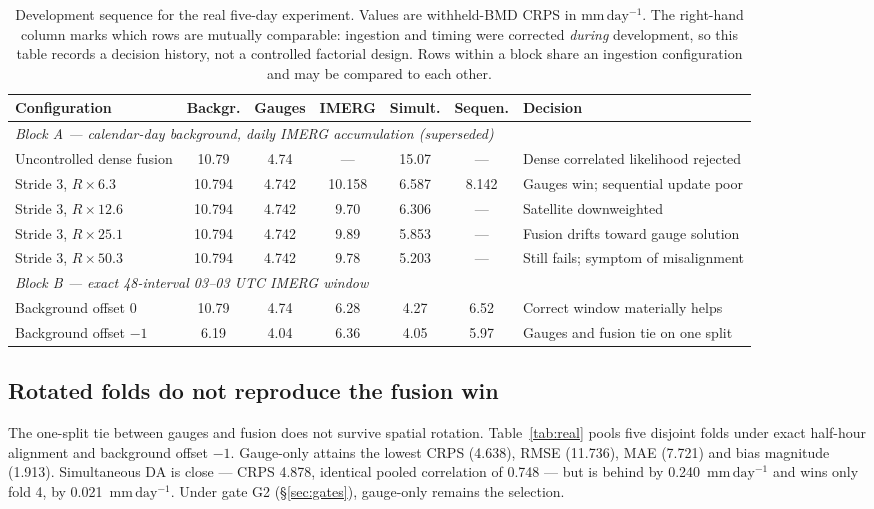 \documentclass[10pt,twocolumn]{article}
\newcommand{\mmday}{\mathrm{mm\,day^{-1}}}
\begin{document}
\begin{table}[t]
\centering
\caption{Development sequence for the real five-day experiment. Values are
withheld-BMD CRPS in $\mmday$. The right-hand column marks which rows are
mutually comparable: ingestion and timing were corrected \emph{during}
development, so this table records a decision history, not a controlled
factorial design. Rows within a block share an ingestion configuration and may
be compared to each other.}
\label{tab:ablation}
\small
\setlength{\tabcolsep}{3.5pt}
\begin{tabular}{p{}ccccc p{}}
\toprule
Configuration & Backgr. & Gauges & IMERG & Simult. & Sequen. & Decision \\
\midrule
\multicolumn{7}{l}{\emph{Block A --- calendar-day background, daily IMERG accumulation (superseded)}}\\
Uncontrolled dense fusion & 10.79 & 4.74 & --- & 15.07 & --- & Dense correlated likelihood rejected \\
Stride 3, $R\times6.3$ & 10.794 & 4.742 & 10.158 & 6.587 & 8.142 & Gauges win; sequential update poor \\
Stride 3, $R\times12.6$ & 10.794 & 4.742 & 9.70 & 6.306 & --- & Satellite downweighted \\
Stride 3, $R\times25.1$ & 10.794 & 4.742 & 9.89 & 5.853 & --- & Fusion drifts toward gauge solution \\
Stride 3, $R\times50.3$ & 10.794 & 4.742 & 9.78 & 5.203 & --- & Still fails; symptom of misalignment \\
\midrule
\multicolumn{7}{l}{\emph{Block B --- exact 48-interval 03--03 UTC IMERG window}}\\
Background offset 0 & 10.79 & 4.74 & 6.28 & 4.27 & 6.52 & Correct window materially helps \\
Background offset $-1$ & 6.19 & 4.04 & 6.36 & 4.05 & 5.97 & Gauges and fusion tie on one split \\
\bottomrule
\end{tabular}
\end{table}

\subsection{Rotated folds do not reproduce the fusion win}
\label{sec:folds}

The one-split tie between gauges and fusion does not survive spatial rotation.
Table~\ref{tab:real} pools five disjoint folds under exact half-hour alignment
and background offset $-1$. Gauge-only attains the lowest CRPS (4.638), RMSE
(11.736), MAE (7.721) and bias magnitude (1.913). Simultaneous DA is close ---
CRPS 4.878, identical pooled correlation of 0.748 --- but is behind by
0.240~$\mmday$ and wins only fold 4, by 0.021~$\mmday$. Under gate G2
(\S\ref{sec:gates}), gauge-only remains the selection.
\end{document}
